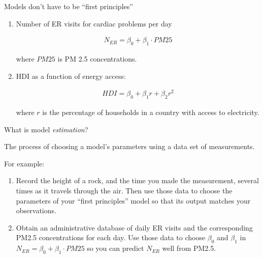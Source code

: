 \documentclass[aspectratio=169, handout]{beamer}
\begin{document}
\begin{frame}{Models don't have to be ``first principles''}

\begin{enumerate}

\item Number of ER visits for cardiac problems per day

\begin{align*}
N_{ER} = \beta_0+ \beta_1\cdot PM25
\end{align*}

where $PM25$ is PM 2.5 concentrations.

\item HDI as a function of energy access:

\begin{align*}
HDI = \beta_0 + \beta_1 r + \beta_2 r^2
\end{align*}

where $r$ is the percentage of households in a country with access to electricity.
\end{enumerate}

\end{frame}



\begin{frame}{What is model \textit{estimation}?}

\pause

The process of choosing a model's parameters using a data set of measurements.  

\pause
\hspace{5mm}

For example:

\begin{enumerate}
\item Record the height of a rock, and the time you made the measurement, several times as it travels through the air.  Then use those data to choose the parameters of your ``first principles'' model so that its output matches your observations.

\hspace{5mm}

\item Obtain an administrative database of daily ER visits and the corresponding PM2.5 concentrations for each day.  Use those data to choose $\beta_0$ and $\beta_1$ in $
N_{ER} = \beta_0+\beta_1\cdot PM25$ so you can predict $N_{ER}$ well from PM2.5.  
\end{enumerate}

\end{frame}
\end{document}
